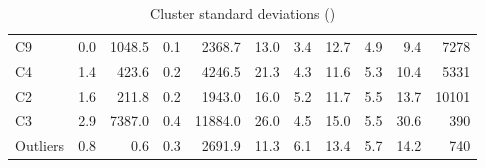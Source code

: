 \begin{table}
\begin{tabular}{l|rrrr|rrrrr|r}
C9  &         0.0 &        1048.5 &     0.1 &                      2368.7 &          13.0 &          3.4 &            12.7 &            4.9 &           9.4 &  7278 \\
C4  &         1.4 &         423.6 &     0.2 &                      4246.5 &          21.3 &          4.3 &            11.6 &            5.3 &          10.4 &  5331 \\
C2  &         1.6 &         211.8 &     0.2 &                      1943.0 &          16.0 &          5.2 &            11.7 &            5.5 &          13.7 & 10101 \\
C3  &         2.9 &        7387.0 &     0.4 &                     11884.0 &          26.0 &          4.5 &            15.0 &            5.5 &          30.6 &   390 \\
Outliers  &         0.8 &           0.6 &     0.3 &                      2691.9 &          11.3 &          6.1 &            13.4 &            5.7 &          14.2 &   740 \\
\bottomrule
\end{tabular}
 \label{table:d10_gmm_std}
 \caption{Cluster standard deviations (\dten)}
 \end{table}


